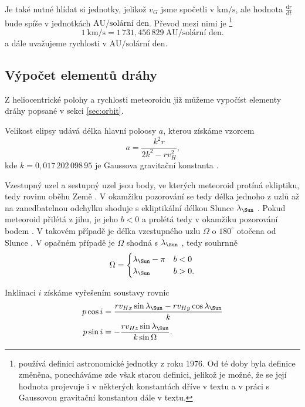 Je také nutné hlídat si jednotky, jelikož $v_G$ jsme spočetli v $\text{km/s}$, ale hodnota $\frac{\text{d}r}{\text{d}t}$ bude spíše v jednotkách $\text{AU/solární den}$. Převod mezi nimi je \cite{ceplecha}\footnote{\cite{ceplecha} používá definici astronomické jednotky z roku 1976. Od té doby byla definice změněna, ponecháváme zde však starou definici, jelikož je možné, že se její hodnota projevuje i v některých konstantách dříve v textu a v práci s Gaussovou gravitační konstantou dále v textu.}
$$
    1\:\text{km/s}=1\,731{,}456\,829\:\text{AU/solární den.}
$$
a dále uvažujeme rychlosti v $\text{AU/solární den}$.

\subsection{Výpočet elementů dráhy}
Z heliocentrické polohy a rychlosti meteoroidu již můžeme vypočíst elementy dráhy popsané v sekci \ref{sec:orbit}.

\smallskip

Velikost elipsy udává délka hlavní poloosy $a$, kterou získáme vzorcem \cite{ceplecha}
\begin{equation}
    a=\frac{k^2 r}{2k^2-r v_H^2}\text{,}
\end{equation}
kde $k=0{,}017\,202\,098\,95$ je Gaussova gravitační konstanta \cite{ceplecha}.

Vzestupný uzel {\NorthNode} a sestupný uzel {\SouthNode}  jsou body, ve kterých meteoroid protíná ekliptiku, tedy rovinu oběhu Země \cite{astro}. V okamžiku pozorování se tedy délka jednoho z uzlů až na zanedbatelnou odchylku shoduje s ekliptikální délkou Slunce $\lambda_\text{\Sun}$ \cite{ceplecha}. Pokud meteoroid přilétá z jihu, je jeho $b < 0$ a prolétá tedy v okamžiku pozorování bodem {\NorthNode}. V takovém případě je délka vzestupného uzlu $\Omega$ o $180^\circ$ otočena od Slunce \cite{ceplecha}. V opačném případě je $\Omega$ shodná s $\lambda_\text{\Sun}$ \cite{ceplecha}, tedy souhrnně
\begin{equation}
    \Omega=\begin{cases}
        \lambda_\text{\Sun}-\pi & b<0 \\
        \lambda_\text{\Sun}     & b>0 \text{.}
    \end{cases}
\end{equation}

Inklinaci $i$ získáme vyřešením soustavy rovnic \cite{ceplecha}
\begin{equation}
    \begin{aligned}
        p\cos{i}&=\frac{rv_{Hx}\sin{\lambda_\text{\Sun}}-rv_{Hy}\cos{\lambda_\text{\Sun}}}{k}\\
        p\sin{i}&=-\frac{rv_{Hz}\sin{\lambda_\text{\Sun}}}{k\sin{\Omega}}\text{.}
    \end{aligned}
    \label{eqn:photo:inclination}
\end{equation}

